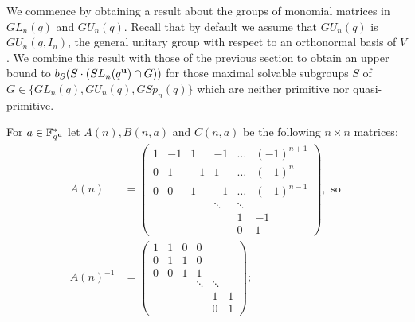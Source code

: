  We commence by obtaining a result about the  groups of monomial matrices in $GL_n(q)$ and $GU_n(q).$ Recall that by default we assume that $GU_n(q)$ is $GU_n(q, I_n)$, the general unitary group with respect to an orthonormal basis of $V$. We combine this result with those of the previous section to obtain 
an upper bound to $b_S(S \cdot (SL_n(q^{\bf u}) \cap G))$ for those maximal solvable subgroups $S$ of $G \in \{GL_n(q), GU_n(q), GSp_n(q)\}$ which are neither primitive nor quasi-primitive.   

\medskip

For $a \in \mathbb{F}_{q^{\bf u}}^*$ let $A(n), B(n,a)$ and $C(n,a)$  be the following $n \times n$ matrices:
\begin{equation}\label{igrek}
\begin{aligned}
A(n) & = \begin{pmatrix}
1      & -1     & 1      & -1     & \ldots & (-1)^{n+1}         \\
0      &   1    & -1     & 1      & \ldots &  (-1)^{n}         \\
0      &    0   & 1      & -1     & \ldots &  (-1)^{n-1}        \\
       &        &        & \ddots &\ddots  &          \\
       &        &        &        & 1      & -1        \\
       &        &        &        & 0      &  1      
\end{pmatrix}, \text{ so } \\
A(n)^{-1} & =
\begin{pmatrix}
1      & 1      & 0      & 0      &        &          \\
0      &   1    & 1      & 0      &        &           \\
0      &    0   & 1      & 1      &        &          \\
       &        &        & \ddots &\ddots  &          \\
       &        &        &        & 1      & 1        \\
       &        &        &        & 0      &  1      
\end{pmatrix};
\end{aligned}
\end{equation}
 
